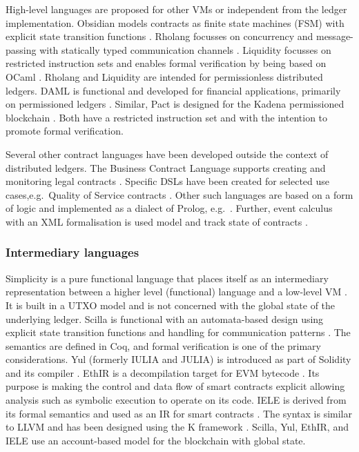 High-level languages are proposed for other VMs or independent from the ledger implementation.
Obsidian models contracts as finite state machines (FSM) with explicit state transition functions \cite{Coblenz2017}.
Rholang focusses on concurrency and message-passing with statically typed communication channels \cite{Meredith2018}.
Liquidity focusses on restricted instruction sets and enables formal verification by being based on OCaml \cite{OCamlProSAS2018}.
Rholang and Liquidity are intended for permissionless distributed ledgers.
DAML is functional and developed for financial applications, primarily on permissioned ledgers \cite{Shaul2018,Meier2018,Lippmeier2018,Huschenbett2018,Bernauer2018,Maric2018,Bleikertz2018,Lochbihler2018,Pilav2018}.
Similar, Pact is designed for the Kadena permissioned blockchain \cite{Popejoy2017}.
Both have a restricted instruction set and with the intention to promote formal verification.

Several other contract languages have been developed outside the context of distributed ledgers. The Business Contract Language supports creating and monitoring legal contracts \cite{Neal.2003,Governatori2006}. Specific DSLs have been created for selected use cases,e.g.\, Quality of Service contracts \cite{Braga2009}.
Other such languages are based on a form of logic and implemented as a dialect of Prolog, e.g.\ \cite{Michael2010}.
Further, event calculus with an XML formalisation is used model and track state of contracts \cite{Farrell2004}.

\subsubsection{Intermediary languages}
Simplicity is a pure functional language that places itself as an intermediary representation between a higher level (functional) language and a low-level VM \cite{OConnor2017}. 
It is built in a UTXO model and is not concerned with the global state of the underlying ledger.
Scilla is functional with an automata-based design using explicit state transition functions and handling for communication patterns \cite{Sergey2018}. The semantics are defined in Coq, and formal verification is one of the primary considerations.
Yul (formerly IULIA and JULIA) is introduced as part of Solidity and its compiler \cite{EthereumFoundation2018IULIA}. 
EthIR is a decompilation target for EVM bytecode \cite{Albert2018}. Its purpose is making the control and data flow of smart contracts explicit allowing analysis such as symbolic execution to operate on its code. 
IELE is derived from its formal semantics and used as an IR for smart contracts \cite{Kasampalis2018}. The syntax is similar to LLVM and has been designed using the K framework \cite{Rosu2007}.
Scilla, Yul, EthIR, and IELE use an account-based model for the blockchain with global state.


